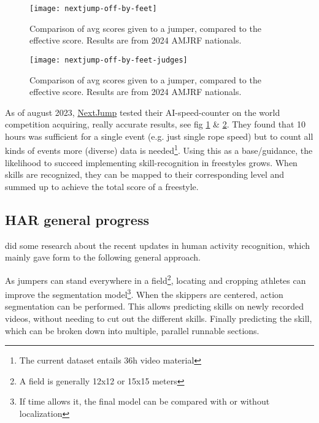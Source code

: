 \begin{figure}
    \centering
    \texttt{[image: nextjump-off-by-feet]}
    \caption[nextjump-results]{Comparison of avg scores given to a jumper, compared to the effective score. Results are from 2024 AMJRF nationals.}
    \label{proposal-fig:nextjump-off-by-feet}
\end{figure}

\begin{figure}
    \centering
    \texttt{[image: nextjump-off-by-feet-judges]}
    \caption[nextjump-results-multi]{Comparison of avg scores given to a jumper, compared to the effective score. Results are from 2024 AMJRF nationals.}
    \label{proposal-fig:nextjump-off-by-feet-judges}
\end{figure}

As of august 2023, \href{https://nextjump.app/}{NextJump} tested their AI-speed-counter on the world competition acquiring, really accurate results, see fig \ref{proposal-fig:nextjump-off-by-feet} \& \ref{proposal-fig:nextjump-off-by-feet-judges}. They found that 10 hours was sufficient for a single event (e.g. just single rope speed) but to count all kinds of events more (diverse) data is needed\footnote{The current dataset entails 36h video material}. Using this as a base/guidance, the likelihood to succeed implementing skill-recognition in freestyles grows.
When skills are recognized, they can be mapped to their corresponding level and summed up to achieve the total score of a freestyle.


\subsection{HAR general progress}

\textcite{Pareek_2020} did some research about the recent updates in human activity recognition, which mainly gave form to the following general approach.

As jumpers can stand everywhere in a field\footnote{A field is generally 12x12 or 15x15 meters}, locating and cropping athletes can improve the segmentation model\footnote{If time allows it, the final model can be compared with or without localization}. When the skippers are centered, action segmentation can be performed. This allows predicting skills on newly recorded videos, without needing to cut out the different skills. Finally predicting the skill, which can be broken down into multiple, parallel runnable sections.

